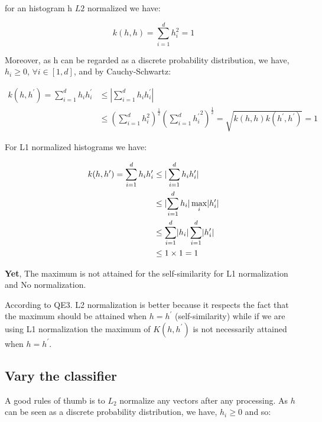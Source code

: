 \documentclass{article}
\DeclarePairedDelimiter\abs{\lvert}{\rvert}%
\begin{document}
for an histogram h $L2$ normalized we have:

\[k(h,h) = \sum\limits_{i=1}^d h_i^2 = 1\]

Moreover, as h can be regarded as a discrete probability distribution, we have, $h_i \geq 0$, $\forall i \in [1,d]$, and by Cauchy-Schwartz:

\begin{align*}
k(h,h^{\prime}) = \sum\limits_{i=1}^d h_i h^{\prime}_i &\leq |\sum\limits_{i=1}^d h_i h^{\prime}_i| \\
&\leq \left(\sum\limits_{i=1}^d h_i^2\right)^{\frac{1}{2}}
\left(\sum\limits_{i=1}^d {h^{\prime}_i}^2\right)^{\frac{1}{2}} = \sqrt{k(h,h)k(h^{\prime},h^{\prime})} = 1
\end{align*}

For L1 normalized histograms we have:

\begin{align*}
k(h,h^{\prime}) = \sum\limits_{i=1}^d h_i h^{\prime}_i &\leq |\sum\limits_{i=1}^d h_i h^{\prime}_i| \\
&\leq \abs{\sum\limits_{i=1}^d h_i} \max\limits_{i} \abs{h^{\prime}_i} \\
&\leq \sum\limits_{i=1}^d \abs{h_i} \sum\limits_{i=1}^d \abs{h^{\prime}_i} \\
&\leq 1 \times 1 = 1
\end{align*}

\textbf{Yet}, The maximum is not attained for the self-similarity for L1 normalization and No normalization.


According to QE3. L2 normalization is better because it respects the fact that the maximum should be attained when $h = h^{\prime}$ (self-similarity) while if we are using L1 normalization the maximum of $K(h, h^{\prime})$ is not necessarily attained when $h = h^{\prime}$.


\subsection{Vary the classifier}

A good rules of thumb is to $L_2$ normalize any vectors after any processing. As $h$ can be seen as a discrete probability distribution, we have, $h_i \geq 0$ and so:
\end{document}
